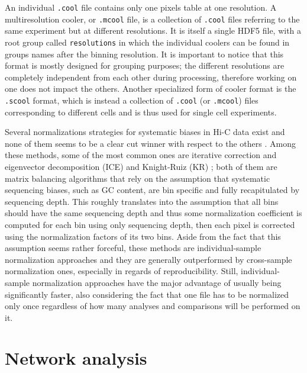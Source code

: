 An individual \texttt{.cool} file contains only one pixels table at one resolution. A multiresolution cooler, or \texttt{.mcool} file, is a collection of \texttt{.cool} files referring to the same experiment but at different resolutions. It is itself a single HDF5 file, with a root group called \texttt{resolutions} in which the individual coolers can be found in groups names after the binning resolution. It is important to notice that this format is mostly designed for grouping purposes; the different resolutions are completely independent from each other during processing, therefore working on one does not impact the others. Another specialized form of cooler format is the \texttt{.scool} format, which is instead a collection of \texttt{.cool} (or \texttt{.mcool}) files corresponding to different cells and is thus used for single cell experiments. 




Several normalizations strategies for systematic biases in Hi-C data exist and none of them seems to be a clear cut winner with respect to the others \cite{normalization2020}. Among these methods, some of the most common ones are iterative correction and eigenvector decomposition (ICE) \cite{ice2012} and Knight-Ruiz (KR) \cite{knightruiz2012}; both of them are matrix balancing algorithms that rely on the assumption that systematic sequencing biases, such as GC content, are bin specific and fully recapitulated by sequencing depth. This roughly translates into the assumption that all bins should have the same sequencing depth and thus some normalization coefficient is computed for each bin using only sequencing depth, then each pixel is corrected using the normalization factors of its two bins. Aside from the fact that this assumption seems rather forceful, these methods are individual-sample normalization approaches and they are generally outperformed by cross-sample normalization ones, especially in regards of reproducibility. Still, individual-sample normalization approaches have the major advantage of usually being significantly faster, also considering the fact that one file has to be normalized only once regardless of how many analyses and comparisons will be performed on it. 

\section{Network analysis}

